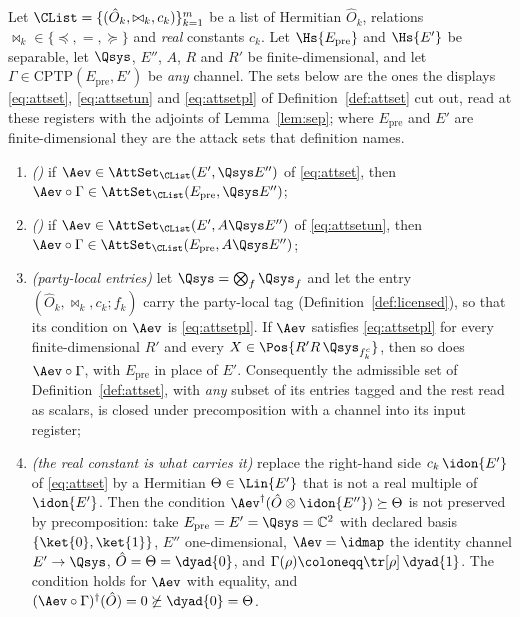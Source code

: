 \begin{lemma}\label{lem:precomposition}
Let $\CList=\{(\hat O_k,\bowtie_k,c_k)\}_{k=1}^{m}$ be a list of Hermitian
$\hat O_k$, relations $\bowtie_k\in\{\preceq,=,\succeq\}$ and \emph{real}
constants $c_k$. Let $\Hs{E_{\mathrm{pre}}}$ and $\Hs{E'}$ be separable, let
$\Qsys$, $E''$, $A$, $R$ and $R'$ be finite-dimensional, and let
$\Gamma\in\mathrm{CPTP}(E_{\mathrm{pre}},E')$ be \emph{any} channel. The sets
below are the ones the displays \eqref{eq:attset}, \eqref{eq:attsetun} and
\eqref{eq:attsetpl} of Definition~\ref{def:attset} cut out, read at these
registers with the adjoints of Lemma~\ref{lem:sep}; where $E_{\mathrm{pre}}$
and $E'$ are finite-dimensional they are the attack sets that definition
names.
\begin{enumerate}[label=(\roman*),leftmargin=3.0em]
\item \emph{()} if
  $\Aev\in\AttSet_{\CList}(E',\Qsys E'')$ of \eqref{eq:attset}, then
  $\Aev\circ\Gamma\in\AttSet_{\CList}(E_{\mathrm{pre}},\Qsys E'')$;
\item \emph{()} if
  $\Aev\in\AttSet_{\CList}(E',A\Qsys E'')$ of \eqref{eq:attsetun}, then
  $\Aev\circ\Gamma\in\AttSet_{\CList}(E_{\mathrm{pre}},A\Qsys E'')$;
\item \emph{(party-local entries)} let $\Qsys=\bigotimes_f\Qsys_f$ and let the
  entry $(\hat O_k,\bowtie_k,c_k;f_k)$ carry the party-local tag
  (Definition~\ref{def:licensed}), so that its condition on $\Aev$ is
  \eqref{eq:attsetpl}. If $\Aev$ satisfies \eqref{eq:attsetpl} for every
  finite-dimensional $R'$ and every $X\in\Pos{R'R\,\Qsys_{f_k^c}}$, then so does
  $\Aev\circ\Gamma$, with $E_{\mathrm{pre}}$ in place of $E'$. Consequently the
  admissible set of Definition~\ref{def:attset}, with \emph{any} subset of its
  entries tagged and the rest read as scalars, is closed under precomposition
  with a channel into its input register;
\item \emph{(the real constant is what carries it)} replace the right-hand side
  $c_k\,\idon{E'}$ of \eqref{eq:attset} by a Hermitian $\Theta\in\Lin{E'}$ that
  is not a real multiple of $\idon{E'}$. Then the condition
  $\Aev^{\dagger}(\hat O\otimes\idon{E''})\succeq\Theta$ is not preserved by
  precomposition: take $E_{\mathrm{pre}}=E'=\Qsys=\mathbb{C}^{2}$ with declared
  basis $\{\ket{0},\ket{1}\}$, $E''$ one-dimensional, $\Aev=\idmap$ the
  identity channel $E'\to\Qsys$, $\hat O=\Theta=\dyad{0}$, and
  $\Gamma(\rho)\coloneqq\tr[\rho]\,\dyad{1}$. The condition holds for $\Aev$
  with equality, and
  $(\Aev\circ\Gamma)^{\dagger}(\hat O)=0\not\succeq\dyad{0}=\Theta$.
\end{enumerate}
\end{lemma}

